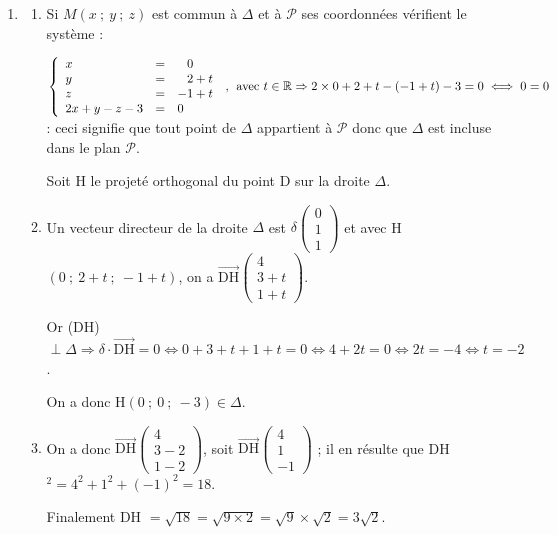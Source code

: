 \documentclass[10pt]{article}
\providecommand{\R}{\mathbb{R}}
\providecommand{\vect}[1]{\overrightarrow{#1}}
\begin{document}
\begin{enumerate}
\begin{enumerate}
Ou encore : la sphère de centre D et de rayon $\sqrt 6$ est tangente en C au plan $\mathcal{P}$, donc quel que soit M dans $\mathcal{P}$, le triangle DCM est rectangle en C, d'hypoténuse [DM] et l'on sait qu'alors DM > DC $= \sqrt 6$ : tout point M du plan aurez que C est donc à une distance supérieure à $\sqrt 6$ de D.
	\end{enumerate}
\item 
	\begin{enumerate}
		\item 
Si $M(x~;~y~;~z)$ est commun à $\Delta$ et à $\mathcal{P}$ ses coordonnées vérifient le système :

$\left\{\begin{array}{l c l}
x &=&\phantom{-}0\\
y &=&\phantom{-}2 + t\\
z &=& -1 + t\\
2x + y - z - 3 &=& 0
\end{array}\right.\:,\:\: \text{avec } t\in \R \Rightarrow 2 \times 0  + 2 + t  - (- 1 + t) - 3 = 0 \iff 0 = 0$ : ceci signifie que tout point de $\Delta$ appartient à $\mathcal{P}$ donc que $\Delta$ est incluse dans le plan $\mathcal{P}$.

Soit H le projeté orthogonal du point D sur la droite $\Delta$.
		\item 
Un vecteur directeur de la droite $\Delta$ est $\delta\begin{pmatrix}0\\1\\1\end{pmatrix}$ et avec H$(0~;~2 + t~;~- 1 + t)$, on a $\vect{\text{DH}}\begin{pmatrix}4\\3 + t\\1 + t\end{pmatrix}$.

Or (DH) $\perp \Delta \Rightarrow \delta \cdot \vect{\text{DH}} = 0 \iff 0 + 3 + t + 1 + t = 0 \iff 4 + 2t = 0 \iff 2t = - 4 \iff t = - 2$.

On a donc H$(0~;~0~;~- 3) \in \Delta$.
		\item 
On a donc $\vect{\text{DH}}\begin{pmatrix}4\\3 - 2\\1 - 2\end{pmatrix}$, soit $\vect{\text{DH}}\begin{pmatrix}4\\1\\- 1\end{pmatrix}$ ; il en résulte que DH$^2 = 4^2 +1^2 + (- 1)^2 = 18$.
		
Finalement DH $= \sqrt{18} = \sqrt{9 \times 2} = \sqrt 9 \times \sqrt 2 = 3\sqrt 2$.
	\end{enumerate}
\end{enumerate}


\bigskip
\end{document}
